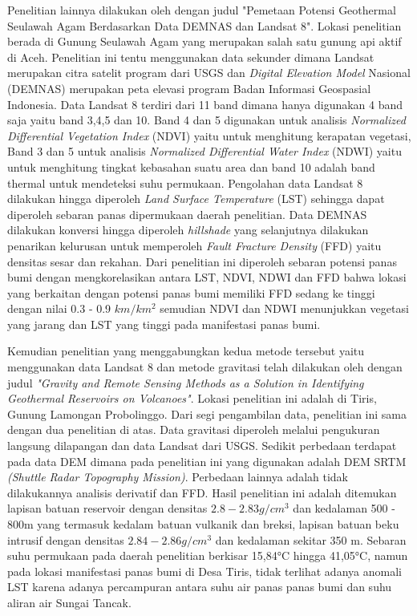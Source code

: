 \hspace{25pt}Penelitian lainnya dilakukan oleh \citep{Faisal2019} dengan judul "Pemetaan Potensi Geothermal Seulawah Agam Berdasarkan Data DEMNAS dan Landsat 8". Lokasi penelitian berada di Gunung Seulawah Agam yang merupakan salah satu gunung api aktif di Aceh. Penelitian ini tentu menggunakan data sekunder dimana Landsat merupakan citra satelit program dari USGS dan \textit{Digital Elevation Model} Nasional (DEMNAS) merupakan peta elevasi program Badan Informasi Geospasial Indonesia. Data Landsat 8 terdiri dari 11 band dimana hanya digunakan 4 band saja yaitu band 3,4,5 dan 10. Band 4 dan 5 digunakan untuk analisis \textit{Normalized Differential Vegetation Index} (NDVI) yaitu untuk menghitung kerapatan vegetasi, Band 3 dan 5 untuk analisis \textit{Normalized Differential Water Index} (NDWI) yaitu untuk menghitung tingkat kebasahan suatu area dan band 10 adalah band thermal untuk mendeteksi suhu permukaan. Pengolahan data Landsat 8 dilakukan hingga diperoleh \textit{Land Surface Temperature} (LST) sehingga dapat diperoleh sebaran panas dipermukaan daerah penelitian. Data DEMNAS dilakukan konversi hingga diperoleh \textit{hillshade} yang selanjutnya dilakukan penarikan kelurusan untuk memperoleh \textit{Fault Fracture Density} (FFD) yaitu densitas sesar dan rekahan. Dari penelitian ini diperoleh sebaran potensi panas bumi dengan mengkorelasikan antara LST, NDVI, NDWI dan FFD bahwa lokasi yang berkaitan dengan potensi panas bumi memiliki FFD sedang ke tinggi dengan nilai 0.3 - 0.9 $km/km^2$ semudian NDVI dan NDWI menunjukkan vegetasi yang jarang dan LST yang tinggi pada manifestasi panas bumi.

\hspace{25pt}Kemudian penelitian yang menggabungkan kedua metode tersebut yaitu menggunakan data Landsat 8 dan metode gravitasi telah dilakukan oleh \citep{Wiyono2022} dengan judul \textit{"Gravity and Remote Sensing Methods as a Solution in Identifying Geothermal Reservoirs on Volcanoes"}. Lokasi penelitian ini adalah di Tiris, Gunung Lamongan Probolinggo. Dari segi pengambilan data, penelitian ini sama dengan dua penelitian di atas. Data gravitasi diperoleh melalui pengukuran langsung dilapangan dan data Landsat dari USGS. Sedikit perbedaan terdapat pada data DEM dimana pada penelitian ini yang digunakan adalah DEM SRTM \textit{(Shuttle Radar Topography Mission)}. Perbedaan lainnya adalah tidak dilakukannya analisis derivatif dan FFD. Hasil penelitian ini adalah ditemukan lapisan batuan reservoir dengan densitas $2.8 - 2.83g/cm^3$ dan kedalaman 500 - 800m yang termasuk kedalam batuan vulkanik dan breksi, lapisan batuan beku intrusif dengan densitas $2.84-2.86 g/cm^3$ dan kedalaman sekitar 350 m. Sebaran suhu permukaan pada daerah penelitian berkisar 15,84°C hingga 41,05°C, namun pada lokasi manifestasi panas bumi di Desa Tiris, tidak terlihat adanya anomali LST karena adanya percampuran antara suhu air panas panas bumi dan suhu aliran air Sungai Tancak.
